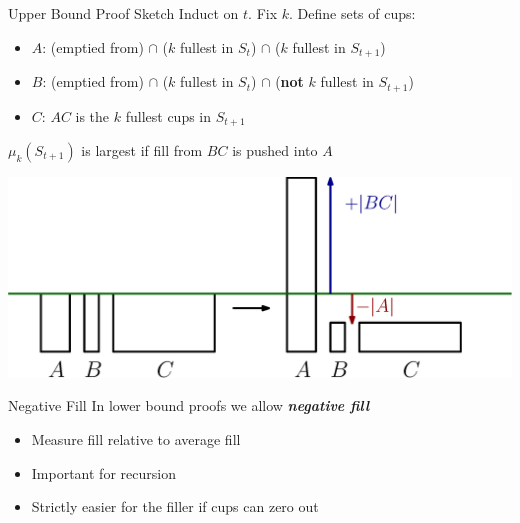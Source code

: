 \documentclass[xcolor=x11names, svgnames, rgb]{beamer}
\newcommand{\defn}[1]       {{\textit{\textbf{\boldmath #1}}}}
\begin{document}
\begin{frame}[t]{Upper Bound Proof Sketch}
  Induct on $t$. Fix $k$. Define sets of cups:\\
  \begin{itemize}
    \item $A$: (emptied from) $\cap$ ($k$ fullest in $S_t$) $\cap$ ($k$ fullest in $S_{t+1}$)
    \item $B$: (emptied from) $\cap$ ($k$ fullest in $S_t$) $\cap$ (\textbf{not} $k$ fullest in $S_{t+1}$)
    \item $C$: $AC$ is the $k$ fullest cups in $S_{t+1}$
  \end{itemize}
  $\mu_k(S_{t+1})$ is largest if fill from $BC$ is pushed into $A$

  \vspace{0.25cm}
  \includegraphics[width=\linewidth]{upperbound/upperboundpf.eps}
\end{frame}

\begin{frame}[t]{Negative Fill}
  In lower bound proofs we allow \defn{negative fill}
  \begin{itemize}
    \item Measure fill relative to average fill
    \item Important for recursion 
    \item Strictly easier for the filler if cups can zero out
  \end{itemize}
\end{frame}
\end{document}

